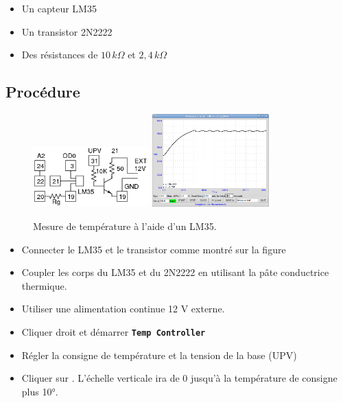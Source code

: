 \documentclass{book}
\newcommand{\nop}{}
\begin{document}
\begin{itemize}
  \item Un capteur LM35
  \item Un transistor 2N2222
  \item Des résistances de $10\, k\Omega$  et $2,4\, k\Omega$
\end{itemize}

\subsection{Procédure}


\begin{figure}[h!]
\begin{center}
\caption{\label{}Mesure de température à l'aide d'un LM35. }\vspace{0.5em}
\includegraphics[width=0.4\textwidth, height=0.3\textwidth, keepaspectratio]{Schematic-temp-control.png}
\includegraphics[width=0.4\textwidth, height=0.3\textwidth, keepaspectratio]{Pic-temp-con.png}
\end{center}
\end{figure}



\begin{itemize}
  \item Connecter le LM35 et le transistor comme montré sur la figure
  \item Coupler les corps du LM35 et du 2N2222 en utilisant la pâte conductrice thermique.
  \item Utiliser une alimentation continue 12 V externe.
  \item Cliquer droit et démarrer  \texttt{\textbf{Temp Controller}\nop}
  \item Régler la consigne de température et la tension de la base (UPV)
  \item Cliquer sur  . L'échelle verticale ira de 0 jusqu'à la température de consigne plus 10°.
\end{itemize}
\end{document}
